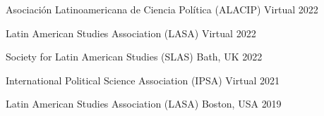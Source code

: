 






\vspace{1mm}

\begin{cvhonors}
\cvconf
{Asociación Latinoamericana de Ciencia Política (ALACIP)} 
{Virtual}
{2022}
\end{cvhonors}

\begin{cvhonors}
\cvconf
{Latin American Studies Association (LASA)} 
{Virtual}
{2022}
\end{cvhonors}

\begin{cvhonors}
\cvconf
{Society for Latin American Studies (SLAS)} 
{Bath, UK}
{2022}
\end{cvhonors}


\begin{cvhonors}
\cvconf
{International Political Science Association (IPSA)} 
{Virtual}
{2021}
\end{cvhonors}

\begin{cvhonors}
\cvconf
{Latin American Studies Association (LASA)} 
{Boston, USA}
{2019}
\end{cvhonors}

